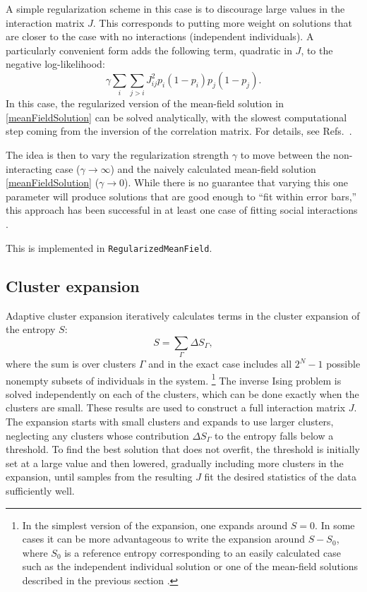 \documentclass[aps,prl,twocolumn]{revtex4-1}
\begin{document}
A simple regularization scheme in this case is to discourage large values in the interaction
matrix $J$.  This corresponds to putting more weight on solutions that are closer to
the case with no interactions (independent individuals).  A particularly convenient form
adds the following term, quadratic in $J$, to the negative log-likelihood:
\begin{equation}
\gamma \sum_i \sum_{j > i} J_{ij}^2 p_i (1-p_i) p_j (1-p_j).
\end{equation}
In this case, the regularized version of the mean-field solution in \eqref{meanFieldSolution}
can be solved analytically, with the slowest computational step coming from the inversion
of the correlation matrix.  For details, see Refs.~\cite{DanKraFla17,BarCoc13}.

The idea is then to vary the regularization strength $\gamma$ to move between the
non-interacting case ($\gamma \rightarrow \infty$) and the naively calculated
mean-field solution \eqref{meanFieldSolution} ($\gamma \rightarrow 0$).
While there is no guarantee that varying this one parameter will produce solutions that are
good enough to ``fit within error bars,'' this approach has been successful in at least
one case of fitting social interactions \cite{DanKraFla17}.

This is implemented in {\tt RegularizedMeanField}.



\subsection{Cluster expansion}
Adaptive cluster expansion \cite{CocMon11,CocMon12,BarCoc13}
iteratively calculates terms in the
cluster expansion of the entropy $S$:
\begin{equation}
S = \sum_\Gamma \Delta S_\Gamma,
\end{equation}
where the sum is over clusters $\Gamma$ and in the exact case
includes all $2^N - 1$ possible nonempty subsets of individuals in the system.
\footnote{In the simplest version of the expansion,
one expands around $S=0$.  In some cases it can be more advantageous to write the
expansion around $S-S_0$, where $S_0$ is a reference entropy corresponding to
an easily calculated case such as
the independent individual solution or one of the mean-field solutions
described in the previous section \cite{BarCoc13}.}
The inverse Ising problem is solved independently
on each of the clusters, which can be done exactly when the
clusters are small.  These results are used to construct a full
interaction matrix $J$.
The expansion starts with small clusters and expands to use larger
clusters, neglecting any clusters whose
contribution $\Delta S_\Gamma$ to the entropy falls below a threshold.
To find the best solution that does not overfit,
the threshold is initially set at a large value and then lowered,
gradually including more clusters in the expansion, until samples from
the resulting $J$ fit the desired statistics of the data sufficiently well.
\end{document}
